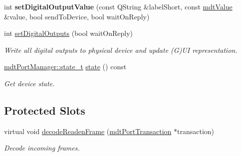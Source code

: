 \begin{DoxyCompactItemize}
\item 
\hypertarget{classmdt_device_a2377d24cc1e767a24dfc5e34454a8737}{
int {\bfseries setDigitalOutputValue} (const QString \&labelShort, const \hyperlink{classmdt_value}{mdtValue} \&value, bool sendToDevice, bool waitOnReply)}
\label{classmdt_device_a2377d24cc1e767a24dfc5e34454a8737}

\item 
int \hyperlink{classmdt_device_a7b86a816e55a91f0d62426e1741437c6}{setDigitalOutputs} (bool waitOnReply)
\begin{DoxyCompactList}\small\item\em Write all digital outputs to physical device and update (G)UI representation. \end{DoxyCompactList}\item 
\hypertarget{classmdt_device_ae0c760cc40523e1116bb5716b077dc1e}{
\hyperlink{classmdt_port_manager_a9448339d7f08ca5e18b904df25b382da}{mdtPortManager::state\_\-t} \hyperlink{classmdt_device_ae0c760cc40523e1116bb5716b077dc1e}{state} () const }
\label{classmdt_device_ae0c760cc40523e1116bb5716b077dc1e}

\begin{DoxyCompactList}\small\item\em Get device state. \end{DoxyCompactList}\end{DoxyCompactItemize}
\subsection*{Protected Slots}
\begin{DoxyCompactItemize}
\item 
virtual void \hyperlink{classmdt_device_ad211ba3be781c3db0397d5bf91f796d1}{decodeReadenFrame} (\hyperlink{classmdt_port_transaction}{mdtPortTransaction} $\ast$transaction)
\begin{DoxyCompactList}\small\item\em Decode incoming frames. \end{DoxyCompactList}\end{DoxyCompactItemize}
